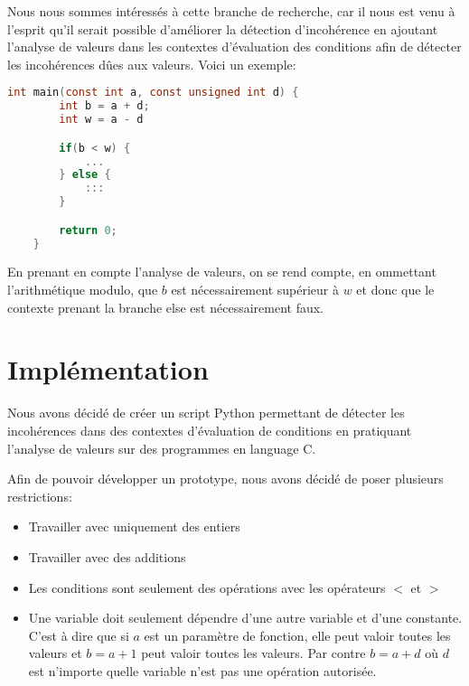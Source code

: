 Nous nous sommes intéressés à cette branche de recherche, car il nous est venu à l'esprit qu'il serait possible d'améliorer la détection d'incohérence en ajoutant l'analyse de valeurs dans les contextes d'évaluation des conditions afin de détecter les incohérences dûes aux valeurs. Voici un exemple:
\begin{lstlisting}[language=c, xleftmargin=.15\textwidth, caption={Exemple d'incohérence détectable par Value Analysis}, captionpos=b]
    int main(const int a, const unsigned int d) {
        int b = a + d;
        int w = a - d

        if(b < w) {
            ...
        } else {
            :::
        }

        return 0;
    }
\end{lstlisting}
En prenant en compte l'analyse de valeurs, on se rend compte, en ommettant l'arithmétique modulo, que $b$ est nécessairement supérieur à $w$ et donc que le contexte prenant la branche else est nécessairement faux.

\section{Implémentation}
Nous avons décidé de créer un script Python permettant de détecter les incohérences dans des contextes d'évaluation de conditions en pratiquant l'analyse de valeurs sur des programmes en language C.

Afin de pouvoir développer un prototype, nous avons décidé de poser plusieurs restrictions:
\begin{itemize}
    \item Travailler avec uniquement des entiers
    \item Travailler avec des additions
    \item Les conditions sont seulement des opérations avec les opérateurs $<$ et $>$
    \item Une variable doit seulement dépendre d'une autre variable et d'une constante. C'est à dire que si $a$ est un paramètre de fonction, elle peut valoir toutes les valeurs et $b = a + 1$ peut valoir toutes les valeurs. Par contre $b = a + d$ où $d$ est  n'importe quelle variable n'est pas une opération autorisée.
\end{itemize}

